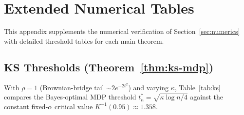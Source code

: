 \documentclass[11pt]{article}
\newcommand{\rhotail}{\rho}  %
\newcommand{\1}{\mathbf{1}}
\theoremstyle{plain}
\theoremstyle{definition}
\theoremstyle{remark}
\begin{document}
\section{Extended Numerical Tables}\label{app:numerical}

This appendix supplements the numerical verification of Section~\ref{sec:numerics} with detailed threshold tables for each main theorem.

\subsection{KS Thresholds (Theorem~\ref{thm:ks-mdp})}

With $\rhotail=1$ (Brownian-bridge tail $\sim 2e^{-2t^2}$) and varying $\kappa$, Table~\ref{tab:ks} compares the Bayes-optimal MDP threshold $t_n^{*}=\sqrt{\kappa\log n/4}$ against the constant fixed-$\alpha$ critical value $K^{-1}(0.95)\approx 1.358$.
\end{document}
